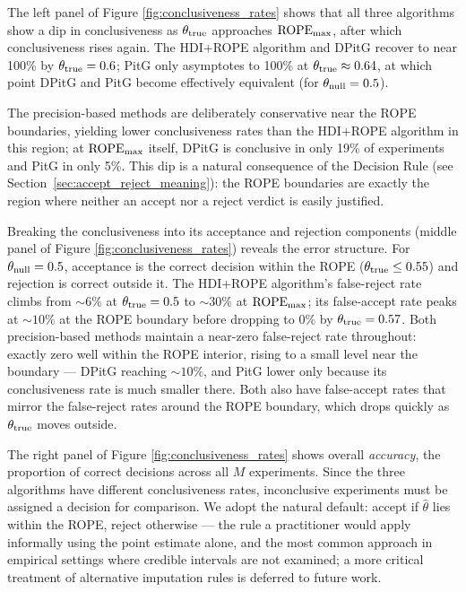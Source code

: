 The left panel of Figure \ref{fig:conclusiveness_rates} shows that all three algorithms show a dip in conclusiveness as $\theta_{\rm true}$ approaches
${\rm ROPE}_{\rm max}$, after which conclusiveness rises again. The HDI+ROPE algorithm and DPitG
recover to near 100\% by $\theta_{\rm true}=0.6$; PitG only asymptotes to 100\% at
$\theta_{\rm true}\approx 0.64$, at which point DPitG and PitG become effectively
equivalent (for $\theta_{\rm null}=0.5$).

The precision-based methods are deliberately conservative near the ROPE boundaries,
yielding lower conclusiveness rates than the HDI+ROPE algorithm in this region; at ${\rm ROPE}_{\rm max}$
itself, DPitG is conclusive in only 19\% of experiments and PitG in only 5\%.
This dip is a natural consequence of the Decision Rule
(see Section~\ref{sec:accept_reject_meaning}): the ROPE boundaries are exactly the region
where neither an accept nor a reject verdict is easily justified.

Breaking the conclusiveness into its acceptance and rejection components (middle panel of Figure \ref{fig:conclusiveness_rates})
reveals the error structure.
For $\theta_{\rm null}=0.5$, acceptance is the correct decision within the ROPE
($\theta_{\rm true}\le 0.55$) and rejection is correct outside it.
The HDI+ROPE algorithm's false-reject rate climbs from $\sim\!6\%$ at $\theta_{\rm true}=0.5$
to $\sim\!30\%$ at ${\rm ROPE}_{\rm max}$; its false-accept rate peaks at
$\sim\!10\%$ at the ROPE boundary before dropping to $0\%$ by
$\theta_{\rm true}=0.57$. Both precision-based methods maintain a near-zero false-reject rate throughout:
exactly zero well within the ROPE interior, rising to a small level near the boundary ---
DPitG reaching $\sim\!10\%$, and PitG lower only because its
conclusiveness rate is much smaller there.
Both also have false-accept rates that mirror the false-reject rates around
the ROPE boundary, which drops quickly as $\theta_{\rm true}$ moves outside.

The right panel of Figure \ref{fig:conclusiveness_rates} shows overall \textit{accuracy}, the proportion of correct decisions
across all $M$ experiments. Since the three algorithms have different conclusiveness
rates, inconclusive experiments must be assigned a decision for comparison.
We adopt the natural default: accept if $\hat{\theta}$ lies within the ROPE, reject
otherwise --- the rule a practitioner would apply informally using the point estimate
alone, and the most common approach in empirical settings where credible intervals are
not examined; a more critical treatment of alternative imputation rules is deferred
to future work.

